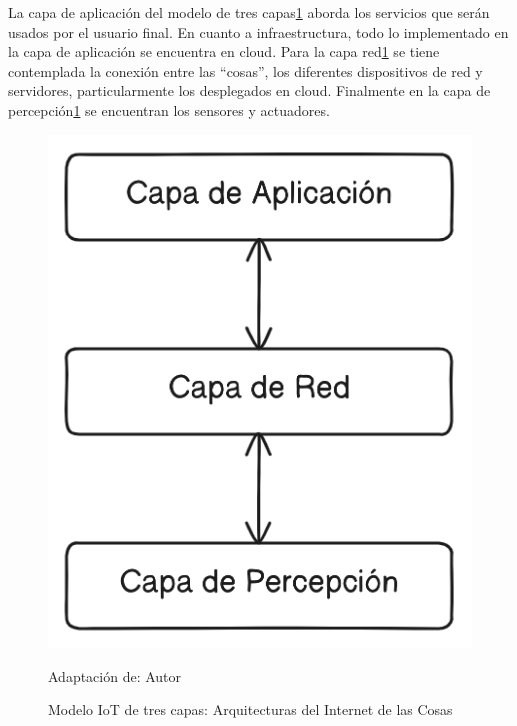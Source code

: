\documentclass[stu,12pt,floatsintext]{apa7}
\begin{document}
	La capa de aplicación del modelo de tres capas\ref{iot_tres_capas} aborda los servicios que serán usados por el usuario final. En cuanto a infraestructura, todo lo implementado en la capa de aplicación se encuentra en cloud.
	Para la capa red\ref{iot_tres_capas} se tiene contemplada la conexión entre las ``cosas'', los diferentes dispositivos de red y servidores, particularmente los desplegados en cloud.
	Finalmente en la capa de percepción\ref{iot_tres_capas} se encuentran los sensores y actuadores.
		\begin{figure}[H]
		\centering
		\includegraphics[scale=0.3]{iot_modelo_3_capas}
		\captionsetup{justification=centering}
		\caption{Modelo IoT de tres capas: Arquitecturas del Internet de las Cosas}
		\small
		\label{iot_tres_capas}
		Adaptación de: Autor
	\end{figure}
	
\end{document}
